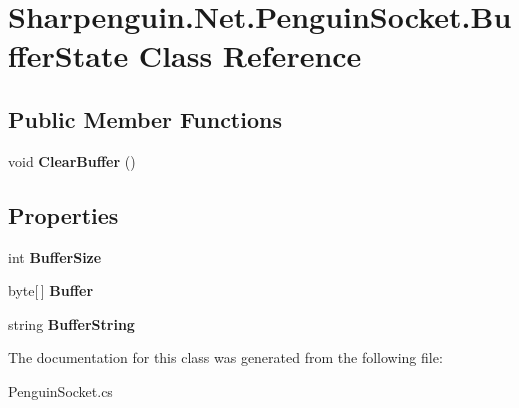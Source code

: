 \hypertarget{classSharpenguin_1_1Net_1_1PenguinSocket_1_1BufferState}{\section{\-Sharpenguin.\-Net.\-Penguin\-Socket.\-Buffer\-State \-Class \-Reference}
\label{classSharpenguin_1_1Net_1_1PenguinSocket_1_1BufferState}
}
\subsection*{\-Public \-Member \-Functions}
\begin{DoxyCompactItemize}
\item 
\hypertarget{classSharpenguin_1_1Net_1_1PenguinSocket_1_1BufferState_a7f60791eefcb5676737befc3cf148cf9}{void {\bfseries \-Clear\-Buffer} ()}\label{classSharpenguin_1_1Net_1_1PenguinSocket_1_1BufferState_a7f60791eefcb5676737befc3cf148cf9}

\end{DoxyCompactItemize}
\subsection*{\-Properties}
\begin{DoxyCompactItemize}
\item 
\hypertarget{classSharpenguin_1_1Net_1_1PenguinSocket_1_1BufferState_afe932a3bee523454ac0b09b7194843df}{int {\bfseries \-Buffer\-Size}}\label{classSharpenguin_1_1Net_1_1PenguinSocket_1_1BufferState_afe932a3bee523454ac0b09b7194843df}

\item 
\hypertarget{classSharpenguin_1_1Net_1_1PenguinSocket_1_1BufferState_a3801f3011e8b0c2493c0b1ab08283866}{byte\mbox{[}$\,$\mbox{]} {\bfseries \-Buffer}}\label{classSharpenguin_1_1Net_1_1PenguinSocket_1_1BufferState_a3801f3011e8b0c2493c0b1ab08283866}

\item 
\hypertarget{classSharpenguin_1_1Net_1_1PenguinSocket_1_1BufferState_a21fb0f33aa590cf88f1d4edc553facf0}{string {\bfseries \-Buffer\-String}}\label{classSharpenguin_1_1Net_1_1PenguinSocket_1_1BufferState_a21fb0f33aa590cf88f1d4edc553facf0}

\end{DoxyCompactItemize}


\-The documentation for this class was generated from the following file\-:\begin{DoxyCompactItemize}
\item 
\-Penguin\-Socket.\-cs\end{DoxyCompactItemize}
